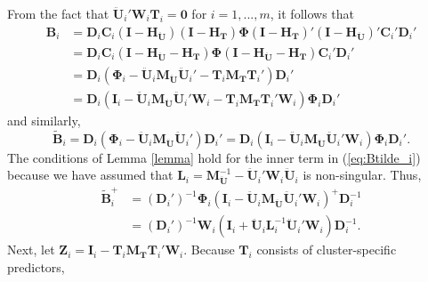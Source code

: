 \documentclass[12pt]{article}
\begin{document}
From the fact that
\(\mathbf{\ddot{U}}_i'\mathbf{W}_i\mathbf{T}_i = \mathbf{0}\) for
\(i = 1,...,m\), it follows that \begin{align}
\mathbf{B}_i &= \mathbf{D}_i \mathbf{C}_i \left(\mathbf{I} - \mathbf{H_{\ddot{U}}}\right) \left(\mathbf{I} - \mathbf{H_T}\right) \boldsymbol\Phi \left(\mathbf{I} - \mathbf{H_T}\right)' \left(\mathbf{I} - \mathbf{H_{\ddot{U}}}\right)' \mathbf{C}_i' \mathbf{D}_i' \nonumber \\ 
&= \mathbf{D}_i \mathbf{C}_i \left(\mathbf{I} - \mathbf{H_{\ddot{U}}} - \mathbf{H_T}\right) \boldsymbol\Phi \left(\mathbf{I} - \mathbf{H_{\ddot{U}}} - \mathbf{H_T}\right) \mathbf{C}_i' \mathbf{D}_i' \nonumber\\ 
&= \mathbf{D}_i \left(\boldsymbol\Phi_i - \mathbf{\ddot{U}}_i \mathbf{M_{\ddot{U}}}\mathbf{\ddot{U}}_i' - \mathbf{T}_i \mathbf{M_T}\mathbf{T}_i'\right)\mathbf{D}_i' \nonumber\\ 
\label{eq:B_i}
&= \mathbf{D}_i \left(\mathbf{I}_i - \mathbf{\ddot{U}}_i \mathbf{M_{\ddot{U}}}\mathbf{\ddot{U}}_i'\mathbf{W}_i - \mathbf{T}_i \mathbf{M_T}\mathbf{T}_i'\mathbf{W}_i\right) \boldsymbol\Phi_i \mathbf{D}_i'
\end{align} and similarly, \begin{equation}
\label{eq:Btilde_i}
\tilde{\mathbf{B}}_i = \mathbf{D}_i \left(\boldsymbol\Phi_i - \mathbf{\ddot{U}}_i \mathbf{M_{\ddot{U}}}\mathbf{\ddot{U}}_i'\right) \mathbf{D}_i' = \mathbf{D}_i \left(\mathbf{I}_i - \mathbf{\ddot{U}}_i \mathbf{M_{\ddot{U}}}\mathbf{\ddot{U}}_i'\mathbf{W}_i\right) \boldsymbol\Phi_i \mathbf{D}_i'.
\end{equation} The conditions of Lemma \ref{lemma} hold for the inner
term in (\ref{eq:Btilde_i}) because we have assumed that
\(\mathbf{L}_i = \mathbf{M}_\mathbf{\ddot{U}}^{-1} - \mathbf{\ddot{U}}_i' \mathbf{W}_i \mathbf{\ddot{U}}_i\)
is non-singular. Thus, \begin{align}
\tilde{\mathbf{B}}_i^+ &= \left(\mathbf{D}_i'\right)^{-1} \boldsymbol\Phi_i \left(\mathbf{I}_i - \mathbf{\ddot{U}}_i \mathbf{M_{\ddot{U}}}\mathbf{\ddot{U}}_i'\mathbf{W}_i\right)^+ \mathbf{D}_i^{-1} \nonumber \\
&= \left(\mathbf{D}_i'\right)^{-1} \mathbf{W}_i \left(\mathbf{I}_i + \mathbf{\ddot{U}}_i \mathbf{L}_i^{-1} \mathbf{\ddot{U}}_i' \mathbf{W}_i\right) \mathbf{D}_i^{-1}.
\end{align} Next, let
\(\mathbf{Z}_i = \mathbf{I}_i - \mathbf{T}_i \mathbf{M_T}\mathbf{T}_i'\mathbf{W}_i\).
Because \(\mathbf{T}_i\) consists of cluster-specific predictors,
\end{document}

